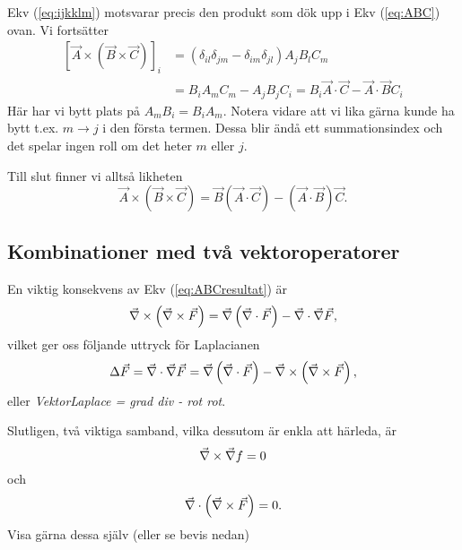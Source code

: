 \documentclass[%
oneside,                 %
final,                   %
10pt]{article}
\begin{document}
Ekv (\ref{eq:ijkklm}) motsvarar precis den produkt som dök upp i Ekv (\ref{eq:ABC}) ovan. Vi fortsätter
\begin{align}
  \left[ \vec{A} \times \left( \vec{B} \times \vec{C} \right) \right]_i 
  &= \left( \delta_{il} \delta_{jm} - \delta_{im} \delta_{jl} \right) A_j B_l C_m \nonumber \\
  &= B_i A_m C_m - A_j B_j C_i = B_i \vec{A}\cdot\vec{C} - \vec{A}\cdot\vec{B} C_i 
\end{align}
Här har vi bytt plats på $A_m B_i = B_i A_m$. Notera vidare att vi lika gärna kunde ha bytt t.ex. $m \to j$ i den första termen. Dessa blir ändå ett summationsindex och det spelar ingen roll om det heter $m$ eller $j$. 

Till slut finner vi alltså likheten
\begin{equation}
  \label{eq:ABCresultat}
  \vec{A} \times \left( \vec{B} \times \vec{C} \right) = \vec{B} (\vec{A}\cdot\vec{C}) - (\vec{A}\cdot\vec{B}) \vec{C}.
\end{equation}

\subsection*{Kombinationer med två vektoroperatorer}

En viktig konsekvens av Ekv (\ref{eq:ABCresultat}) är
\begin{equation}
  \vec{\nabla} \times \left( \vec{\nabla} \times \vec{F} \right) = \vec{\nabla} \left( \vec{\nabla} \cdot \vec{F} \right) - \vec{\nabla} \cdot \vec{\nabla} \vec{F},
\end{equation}
vilket ger oss följande uttryck för Laplacianen
\begin{equation}
  \Delta \vec{F} = \vec{\nabla} \cdot \vec{\nabla} \vec{F} = \vec{\nabla} \left( \vec{\nabla} \cdot \vec{F} \right) - \vec{\nabla} \times \left( \vec{\nabla} \times \vec{F} \right),
\end{equation}
eller \emph{VektorLaplace = grad div - rot rot}.

Slutligen, två viktiga samband, vilka dessutom är enkla att härleda, är 
\begin{equation}
\label{eq:ddf}
  \vec{\nabla} \times \vec{\nabla} f = 0
\end{equation}
och
\begin{equation}
\label{eq:ddf2}
  \vec{\nabla} \cdot \left( \vec{\nabla} \times \vec{F}\right) = 0.
\end{equation}
Visa gärna dessa själv (eller se bevis nedan)
\end{document}
